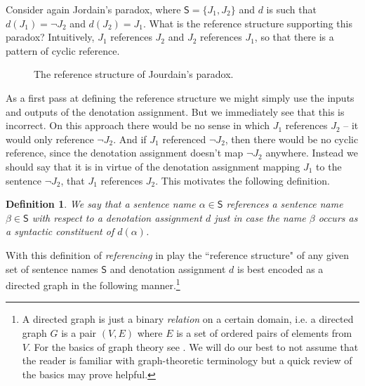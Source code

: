 \documentclass[12pt]{article}
\newtheorem{defn}{Definition}
\theoremstyle{remark}
\newcommand{\prg}{\hspace{0.25in}}
\def\S{\textsf{S}}
\begin{document}
\prg Consider again Jordain's paradox, where $\S = \{J_1, J_2\}$ and $d$ is such that  $d(J_1) = \neg J_2$ and $d(J_2) = J_1$. What is the reference structure supporting this paradox? Intuitively, $J_1$ references $J_2$ and $J_2$ references $J_1$, so that there is a pattern of cyclic reference.


\begin{figure}[h]
\centering




\caption{The reference structure of Jourdain's paradox.}
\end{figure}

As a first pass at defining the reference structure we might simply use the inputs and outputs of the denotation assignment. But we immediately see that this is incorrect. On this approach there would be no sense in which $J_1$ references $J_2$ -- it would only reference $\neg J_2$. And if $J_1$ referenced $\neg J_2$, then there would be no cyclic reference, since the denotation assignment doesn't map $\neg J_2$ anywhere. Instead we should say that it is in virtue of the denotation assignment mapping $J_1$ to the sentence $\neg J_2$, that $J_1$ references $J_2$. This motivates the following definition.

\begin{defn} We say that a sentence name $\alpha \in \S$ \emph{references} a sentence name $\beta\in \S$ with respect to a denotation assignment $d$ just in case the name $\beta$ occurs as a syntactic constituent of $d(\alpha)$. 
\end{defn}

With this definition of \textit{referencing}  in play the ``reference structure"  of any given set of sentence names $\S$ and denotation assignment $d$ is best encoded as a directed graph in the following manner.\footnote{A directed graph is just a binary \textit{relation} on a certain domain, i.e. a directed graph $G$ is a pair $(V, E)$ where $E$ is a set of ordered pairs of elements from $V$. For the basics of graph theory see \cite{diestel2010}. We will do our best to not assume that the reader is familiar with graph-theoretic terminology but a quick review of the basics may prove helpful.}
\end{document}
